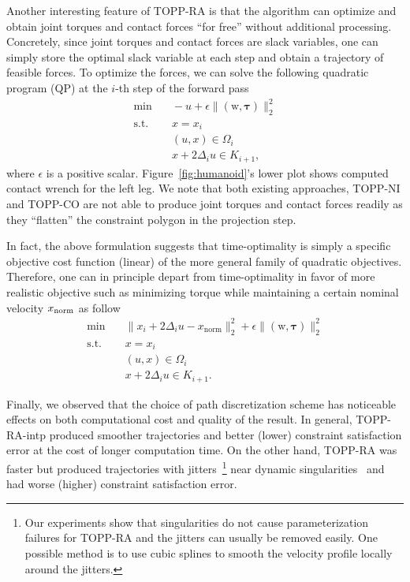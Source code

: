 \documentclass[journal]{IEEEtran}
\theoremstyle{plain}
\theoremstyle{definition}
\theoremstyle{definition}
\newcommand{\bftau}{\boldsymbol{\mathbf{\tau}}}
\renewcommand{\vec}[1]{\bm{\mathrm{#1}}}  %
\begin{document}
Another interesting feature of TOPP-RA is that the algorithm can
optimize and obtain joint torques and contact forces ``for free''
without additional processing. Concretely, since joint torques and
contact forces are slack variables, one can simply store the optimal
slack variable at each step and obtain a trajectory of feasible
forces. To optimize the forces, we can solve the following quadratic
program (QP) at the $i$-th step of the forward pass
\begin{equation*}
  \begin{aligned}
    \min & \quad - u + \epsilon \|(\vec w, \bftau)\|_2^2\\
    \mathrm{s.t.} & \quad x = x_i \\
         & \quad (u, x)  \in \Omega_i\\
         & \quad x + 2 \Delta_i u \in K_{i+1},
  \end{aligned}
\end{equation*}
where $\epsilon$ is a positive scalar.  Figure~\ref{fig:humanoid}'s
lower plot shows computed contact wrench for the left leg.  We note
that both existing approaches, TOPP-NI and TOPP-CO are not able to
produce joint torques and contact forces readily as they ``flatten''
the constraint polygon in the projection step.

In fact, the above formulation suggests that time-optimality is simply
a specific objective cost function (linear) of the more general family
of quadratic objectives. Therefore, one can in principle depart from
time-optimality in favor of more realistic objective such as
minimizing torque while maintaining a certain nominal velocity
$x_{\rm{norm}}$ as follow
\begin{equation*}
  \begin{aligned}
    \min & \quad \|x_i + 2 \Delta_i u - x_{\mathrm{norm}} \|_2^2 + \epsilon \|(\vec w, \bftau)\|_2^2 \\
    \mathrm{s.t.} & \quad x = x_i \\
         & \quad (u, x)  \in \Omega_i\\
         & \quad x + 2 \Delta_i u \in K_{i+1}.
  \end{aligned}
\end{equation*}

Finally, we observed that the choice of path discretization scheme has
noticeable effects on both computational cost and quality of the
result.  In general, TOPP-RA-intp produced smoother trajectories and
better (lower) constraint satisfaction error at the cost of longer
computation time. On the other hand, TOPP-RA was faster but produced
trajectories with jitters~\footnote{Our experiments show that
  singularities do not cause parameterization failures for TOPP-RA and
  the jitters can usually be removed easily. One possible method is to
  use cubic splines to smooth the velocity profile locally around the
  jitters.} near dynamic singularities~\cite{pham2014general} and had
worse (higher) constraint satisfaction error.
\end{document}
